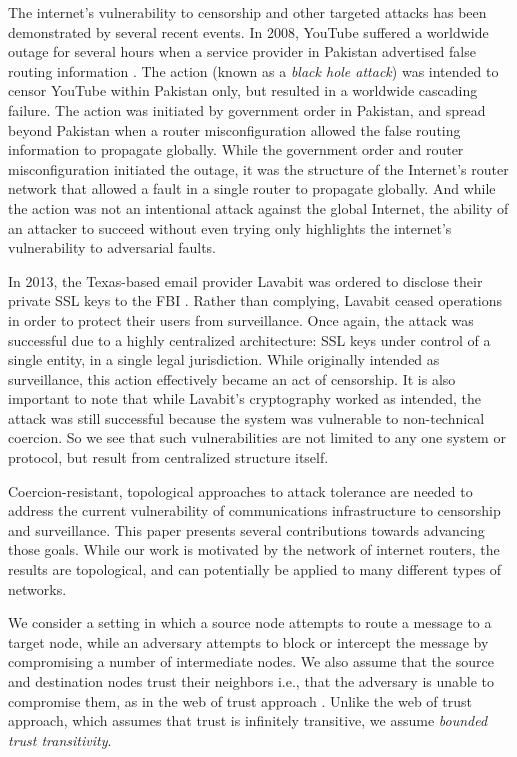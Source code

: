 \documentclass[10pt,letterpaper]{article}
\begin{document}
The internet's vulnerability to censorship and other targeted attacks
has been demonstrated by several recent events.
In 2008, YouTube suffered a worldwide outage for several hours
when a service provider in Pakistan advertised false routing information
\cite{hunter_pakistan_2008}.
The action (known as a {\em black hole attack}) was intended to censor YouTube
within Pakistan only, but resulted in a worldwide cascading failure.
The action was initiated by government order in Pakistan,
and spread beyond Pakistan when a router misconfiguration allowed the false
routing information to propagate globally.
While the government order and router misconfiguration initiated the outage,
it was the structure of the Internet's router network that allowed a fault in a
single router to propagate globally.
And while the action was not an intentional attack against the global Internet,
the ability of an attacker to succeed without even trying only highlights
the internet's vulnerability to adversarial faults.

In 2013, the Texas-based email provider Lavabit was ordered to disclose
their private SSL keys to the FBI \cite{poulsen_edward_2013}.
Rather than complying,
Lavabit ceased operations
in order to protect their users from surveillance.
Once again, the attack was successful due to a highly centralized
architecture:
SSL keys under control of a single entity, in a single legal jurisdiction.
While originally intended as surveillance,
this action effectively became an act of censorship.
It is also important to note that while Lavabit's cryptography worked as intended,
the attack was still successful because the system was
vulnerable to non-technical coercion.
So we see that such vulnerabilities are not limited to any one system or protocol,
but result from centralized structure itself.

Coercion-resistant, topological approaches to attack tolerance are needed to
address the current vulnerability of communications infrastructure
to censorship and surveillance.
This paper presents several contributions towards advancing those goals.
While our work is motivated by the network of internet routers,
the results are topological,
and can potentially be applied to many different types of networks.

We consider a setting in which a source node attempts to route a message
to a target node, while an adversary attempts to block or intercept the message
by compromising a number of intermediate nodes.
We also assume that the source and destination nodes trust their neighbors
i.e., that the adversary is unable to compromise them,
as in the web of trust approach
\cite{zimmermann_official_1995,ferguson_practical_2003}.
Unlike the web of trust approach, which assumes that trust is infinitely
transitive,
we assume {\em bounded trust transitivity}.
\end{document}
